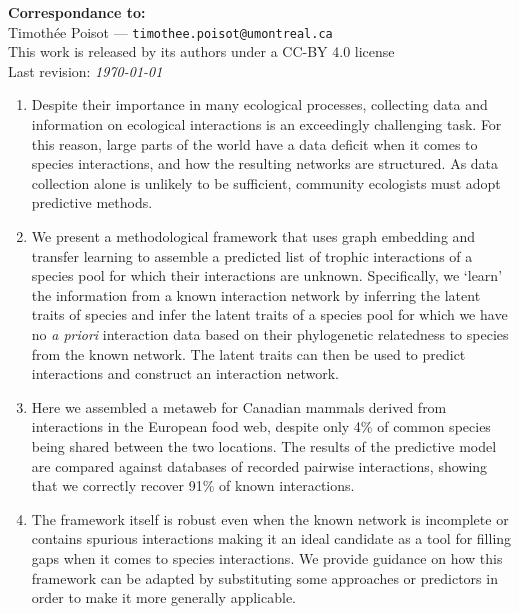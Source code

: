 \documentclass[11pt]{article}
\begin{document}
\textbf{Correspondance to:}\\
Timothée Poisot --- \texttt{timothee.poisot@umontreal.ca}\\

\vfill
This work is released by its authors under a CC-BY 4.0 license\hfill\ccby\\
Last revision: \emph{\today}

\clearpage
\thispagestyle{empty}

\vfill

\begin{enumerate}
    \item Despite their importance in many ecological processes,
collecting data and information on ecological interactions is an
exceedingly challenging task. For this reason, large parts of the world
have a data deficit when it comes to species interactions, and how the
resulting networks are structured. As data collection alone is unlikely
to be sufficient, community ecologists must adopt predictive methods.%
    \item We present a methodological framework that uses graph
embedding and transfer learning to assemble a predicted list of trophic
interactions of a species pool for which their interactions are unknown.
Specifically, we `learn' the information from a known interaction
network by inferring the latent traits of species and infer the latent
traits of a species pool for which we have no \emph{a priori}
interaction data based on their phylogenetic relatedness to species from
the known network. The latent traits can then be used to predict
interactions and construct an interaction network.%
    \item Here we assembled a metaweb for Canadian mammals derived from
interactions in the European food web, despite only 4\% of common
species being shared between the two locations. The results of the
predictive model are compared against databases of recorded pairwise
interactions, showing that we correctly recover 91\% of known
interactions.%
    \item The framework itself is robust even when the known network is
incomplete or contains spurious interactions making it an ideal
candidate as a tool for filling gaps when it comes to species
interactions. We provide guidance on how this framework can be adapted
by substituting some approaches or predictors in order to make it more
generally applicable.%
\end{enumerate}


\vfill
\end{document}

